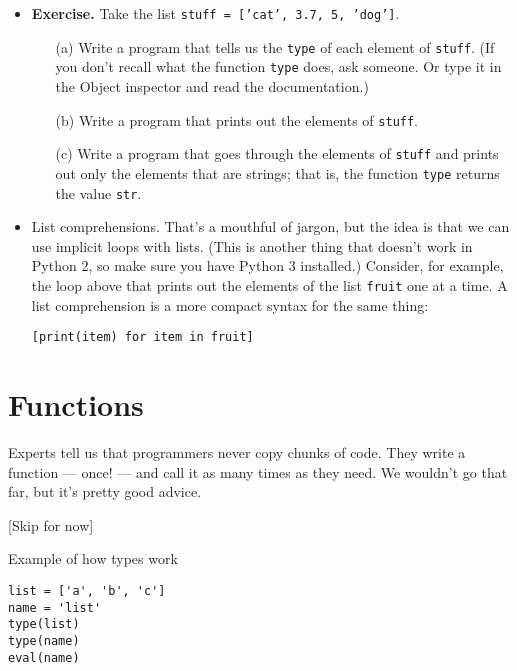 \documentclass[11pt]{article}
\begin{document}
\begin{itemize}
\item {\bf Exercise.}
Take the list {\tt stuff = ['cat', 3.7, 5, 'dog']}.
\begin{itemize}
\item [(a)]Write a program that tells us the {\tt type} of each element of {\tt stuff}.
(If you don't recall what the function {\tt type} does, ask someone.
Or type it in the  Object inspector and read the documentation.)
\item [(b)]  Write a program that prints out the elements of {\tt stuff}.
\item [(c)]  Write a program that goes through the elements of {\tt stuff}
and prints out only the elements that are strings;
that is, the function {\tt type} returns the value {\tt str}.
\end{itemize}


\item List comprehensions.
That's a mouthful of jargon, but the idea is that we can
use implicit loops with lists.
(This is another thing that doesn't work in Python 2, so make sure you have Python 3 installed.)
Consider, for example, the loop above that prints out the elements of the list {\tt fruit} one at a time.
A list comprehension is a more compact syntax for the same thing:
\begin{verbatim}
[print(item) for item in fruit]
\end{verbatim}


\end{itemize}

\section{Functions}

Experts tell us that programmers never copy chunks of code.
They write a function --- once! --- and call it as
many times as they need.
We wouldn't go that far, but it's pretty good advice.

[Skip for now]

Example of how types work

\begin{verbatim}
list = ['a', 'b', 'c']
name = 'list'
type(list)
type(name)
eval(name)
\end{verbatim}
\end{document}
